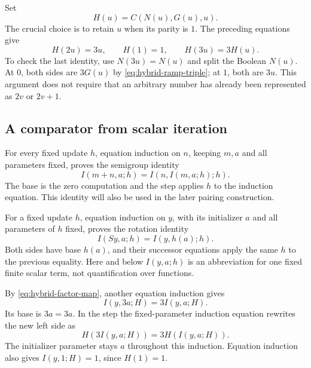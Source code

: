 \documentclass[11pt,letterpaper]{article}
\theoremstyle{definition}\newtheorem{definition}[theorem]{Definition}
\theoremstyle{remark}\newtheorem{remark}[theorem]{Remark}
\begin{document}
Set
\[
 H(u)=C(N(u),G(u),u).
\]
The crucial choice is to retain $u$ when its parity is $1$.
The preceding equations give
\begin{equation}
 H(2u)=3u,\qquad H(1)=1,\qquad H(3u)=3H(u).
 \label{eq:hybrid-factor-map}
\end{equation}
To check the last identity, use $N(3u)=N(u)$ and split the Boolean
$N(u)$.  At $0$, both sides are $3G(u)$ by
\eqref{eq:hybrid-ramp-triple}; at $1$, both are $3u$.
This argument does not require that an arbitrary number has already
been represented as $2v$ or $2v+1$.

\subsection{A comparator from scalar iteration}

For every fixed update $h$, equation induction on $n$, keeping $m,a$
and all parameters fixed, proves the semigroup identity
\[
 I(m+n,a;h)=I(n,I(m,a;h);h).
\]
The base is the zero computation and the step applies $h$ to the
induction equation. This identity will also be used in the later
pairing construction.


For a fixed update $h$, equation induction on $y$, with its initializer
$a$ and all parameters of $h$ fixed, proves the rotation identity
\begin{equation}
 I(Sy,a;h)=I(y,h(a);h).
 \label{eq:hybrid-rotation}
\end{equation}
Both sides have base $h(a)$, and their successor equations apply the
same $h$ to the previous equality.  Here and below $I(y,a;h)$ is
an abbreviation for one fixed finite scalar term, not quantification
over functions.

By \eqref{eq:hybrid-factor-map}, another equation induction gives
\begin{equation}
 I(y,3a;H)=3I(y,a;H).
 \label{eq:hybrid-iterator-scaling}
\end{equation}
Its base is $3a=3a$.  In the step the fixed-parameter induction
equation rewrites the new left side as
\[
 H(3I(y,a;H))=3H(I(y,a;H)).
\]
The initializer parameter stays $a$ throughout this induction.
Equation induction also gives $I(y,1;H)=1$, since $H(1)=1$.
\end{document}
